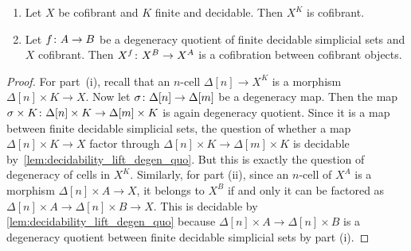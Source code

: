 \documentclass[reqno,10pt,a4paper,oneside,draft]{amsart}
\begin{document}
\begin{proposition} \label{prop:X^kCofibrant}  \hfill 
\begin{enumerate}[$(i)$]
\item Let $X$ be cofibrant and $K$ finite and decidable. Then $X^K$ is cofibrant.
\item Let $f \colon A \rightarrow B$ be a degeneracy quotient of finite decidable simplicial sets and $X$  cofibrant. Then $X^f \colon X^B \rightarrow X^A$ is a cofibration between cofibrant objects.
\end{enumerate}
\end{proposition}

\begin{proof}  For part~(i), recall that an $n$-cell $\Delta[n] \rightarrow X^K$ is a morphism $\Delta[n] \times K \rightarrow X$. Now let $\sigma \colon \Delta[n] \rightarrow \Delta[m]$ be a degeneracy map. Then the map 
$\sigma \times K \colon \Delta[n] \times K \rightarrow \Delta[m] \times K$ is again degeneracy quotient.
Since it is a map between finite decidable simplicial sets, the question of whether a map $\Delta[n] \times K \rightarrow X$ factor through $\Delta[n] \times K \rightarrow \Delta[m] \times K$ is decidable
by~\cref{lem:decidability_lift_degen_quo}. But this is exactly the question of degeneracy of cells in $X^K$.
Similarly, for part (ii), since an $n$-cell of $X^A$ is a morphism $\Delta[n] \times A \rightarrow X$, it belongs to $X^B$ if and only it can be factored as $\Delta[n] \times A \rightarrow \Delta[n] \times B \rightarrow X$. This is decidable by \cref{lem:decidability_lift_degen_quo} because $\Delta[n] \times A \rightarrow \Delta[n] \times B$ is a degeneracy quotient between finite decidable simplicial sets by part (i).
\end{proof} 
\end{document}
